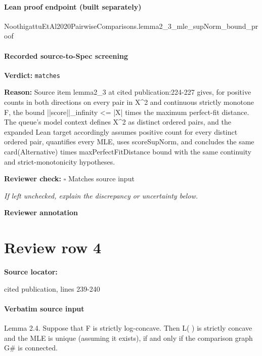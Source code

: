 \documentclass[10pt]{article}
\newcommand{\reviewerbox}{%
  \par\noindent\fbox{\parbox{0.96\linewidth}{\rule{0pt}{0.38in}}}\par
}
\newcommand{\reviewmatch}[1]{%
  \par\noindent\textbf{Reviewer check:} $\square$\; #1\par
  \noindent\emph{If left unchecked, explain the discrepancy or uncertainty below.}\par
}
\begin{document}
\paragraph{Lean proof endpoint (built separately)}\begin{ReviewVerbatim}
NoothigattuEtAl2020PairwiseComparisons.lemma2_3_mle_supNorm_bound_proof
\end{ReviewVerbatim}

\paragraph{Recorded source-to-Spec screening}
\textbf{Verdict:} \texttt{matches}
\\
{\raggedright
\textbf{Reason:} Source item lemma2\_\allowbreak{}3 at cited publication:\allowbreak{}224-\allowbreak{}227 gives, for positive counts in both directions on every pair in X\textasciicircum{}2 and continuous strictly monotone F, the bound ||score||\_\allowbreak{}infinity <= |X| times the maximum perfect-\allowbreak{}fit distance.\allowbreak{} The queue's model context defines X\textasciicircum{}2 as distinct ordered pairs, and the expanded Lean target accordingly assumes positive count for every distinct ordered pair, quantifies every MLE, uses scoreSupNorm, and concludes the same card(Alternative) times maxPerfectFitDistance bound with the same continuity and strict-\allowbreak{}monotonicity hypotheses.\allowbreak{}
\par}
\reviewmatch{Matches source input}
\noindent\textbf{Reviewer annotation}\par
\reviewerbox
\clearpage
\hypertarget{source-claim-45a27951c21eefad}{}
\section*{Review row 4}
\textbf{Source locator:} {\footnotesize\raggedright cited publication, lines 239-\allowbreak{}240\par}
\paragraph{Verbatim source input}
\begin{ReviewVerbatim}
Lemma 2.4. Suppose that F is strictly log-concave. Then L( ) is strictly concave and the MLE is
unique (assuming it exists), if and only if the comparison graph G# is connected.
\end{ReviewVerbatim}
\end{document}
